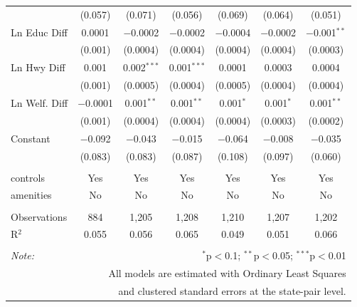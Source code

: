\begin{table}[!htbp]
\begin{tabular}{@{\extracolsep{5pt}}lcccccc}
  & (0.057) & (0.071) & (0.056) & (0.069) & (0.064) & (0.051) \\ 
  Ln Educ Diff & 0.0001 & $-$0.0002 & $-$0.0002 & $-$0.0004 & $-$0.0002 & $-$0.001$^{**}$ \\ 
  & (0.001) & (0.0004) & (0.0004) & (0.0004) & (0.0004) & (0.0003) \\ 
  Ln Hwy Diff & 0.001 & 0.002$^{***}$ & 0.001$^{***}$ & 0.0001 & 0.0003 & 0.0004 \\ 
  & (0.001) & (0.0005) & (0.0004) & (0.0005) & (0.0004) & (0.0004) \\ 
  Ln Welf. Diff & $-$0.0001 & 0.001$^{**}$ & 0.001$^{**}$ & 0.001$^{*}$ & 0.001$^{*}$ & 0.001$^{**}$ \\ 
  & (0.001) & (0.0004) & (0.0004) & (0.0004) & (0.0003) & (0.0002) \\ 
  Constant & $-$0.092 & $-$0.043 & $-$0.015 & $-$0.064 & $-$0.008 & $-$0.035 \\ 
  & (0.083) & (0.083) & (0.087) & (0.108) & (0.097) & (0.060) \\ 
 \hline \\[-1.8ex] 
controls & Yes & Yes & Yes & Yes & Yes & Yes \\ 
amenities & No & No & No & No & No & No \\ 
\hline \\[-1.8ex] 
Observations & 884 & 1,205 & 1,208 & 1,210 & 1,207 & 1,202 \\ 
R$^{2}$ & 0.055 & 0.056 & 0.065 & 0.049 & 0.051 & 0.066 \\ 
\hline 
\hline \\[-1.8ex] 
\textit{Note:}  & \multicolumn{6}{r}{$^{*}$p$<$0.1; $^{**}$p$<$0.05; $^{***}$p$<$0.01} \\ 
 & \multicolumn{6}{r}{All models are estimated with Ordinary Least Squares} \\ 
 & \multicolumn{6}{r}{and clustered standard errors at the state-pair level.} \\ 
\end{tabular} 
\end{table} 
